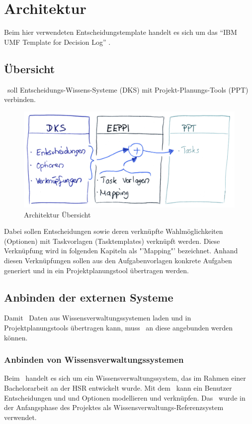 \chapter{Architektur}
	
	Beim hier verwendeten Entscheidungstemplate handelt es sich um das "`IBM UMF Template for Decision Log"' \cite{hand_ibm_2008}.
	
	\section{Übersicht}
		\eeppi\ soll Entscheidungs-Wissens-Systeme (DKS) mit 
		Projekt-Planungs-Tools (PPT) verbinden.
		
		\begin{figure}[H]
			\includegraphics[width=\textwidth]{architecture/media/img/eeppiSchema.jpg}
			\centering
			\caption{Architektur Übersicht}
			\label{fig:architectureSchema}
		\end{figure}	
		
		Dabei sollen Entscheidungen sowie deren verknüpfte Wahlmöglichkeiten (Optionen) mit Taskvorlagen (Tasktemplates) verknüpft werden.
		Diese Verknüpfung wird in folgenden Kapiteln als "'Mapping"' bezeichnet. 
		Anhand diesen Verknüpfungen sollen aus den Aufgabenvorlagen konkrete Aufgaben generiert und in ein Projektplanungstool übertragen werden.
	
	
	\section{Anbinden der externen Systeme}
		Damit \eeppi\ Daten aus Wissensverwaltungssystemen laden und in Projektplanungstools übertragen kann, muss \eeppi\ an diese angebunden werden können.
		
	
		\subsection{Anbinden von Wissensverwaltungssystemen}
			Beim \cdar\ handelt es sich um ein Wissensverwaltungssystem, 
			das im Rahmen einer Bachelorarbeit an der HSR entwickelt wurde. Mit dem \cdar\ kann ein Benutzer Entscheidungen und und Optionen modellieren und verknüpfen. Das \cdar\ wurde in der Anfangsphase des Projektes als Wissensverwaltungs-Referenzsystem verwendet.
			
